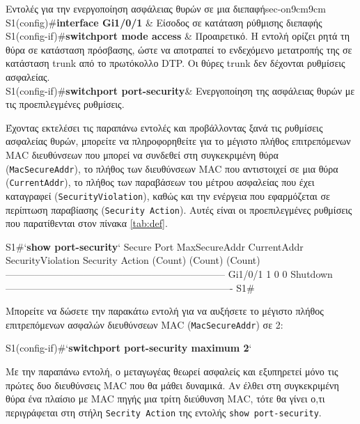 \documentclass{EdipyLabs} %
\begin{document}
\begin{CommandTable*}{Εντολές για την ενεργοποίηση ασφάλειας θυρών σε μια διεπαφή}{sec-on}{9cm}{9cm}
	S1(config)\#\textbf{interface Gi1/0/1}			& Είσοδος σε κατάταση ρύθμισης διεπαφής\\
	S1(config-if)\#\textbf{switchport mode access}  & Προαιρετικό. Η εντολή ορίζει ρητά τη θύρα σε κατάσταση πρόσβασης, ώστε να αποτραπεί το ενδεχόμενο μετατροπής της σε κατάσταση trunk από το πρωτόκολλο DTP. Οι θύρες trunk δεν δέχονται ρυθμίσεις ασφαλείας.\\
	S1(config-if)\#\textbf{switchport port-security}& Ενεργοποίηση της ασφάλειας θυρών με τις προεπιλεγμένες ρυθμίσεις.
\end{CommandTable*}
	
Έχοντας εκτελέσει τις παραπάνω εντολές και προβάλλοντας ξανά τις ρυθμίσεις ασφαλείας θυρών, μπορείτε να πληροφορηθείτε για το μέγιστο πλήθος επιτρεπόμενων MAC διευθύνσεων που μπορεί να συνδεθεί στη συγκεκριμένη θύρα (\texttt{MacSecureAddr}), το πλήθος των διευθύνσεων MAC που αντιστοιχεί σε μια θύρα (\texttt{CurrentAddr}), το πλήθος των παραβάσεων του μέτρου ασφαλείας που έχει καταγραφεί (\texttt{SecurityViolation}), καθώς και την ενέργεια που εφαρμόζεται σε περίπτωση παραβίασης (\texttt{Security Action}). Αυτές είναι οι προεπιλεγμένες ρυθμίσεις που παρατίθενται στον πίνακα \ref{tab:def}.

\begin{CommandBox}
S1#`\textbf{show port-security}`
Secure Port MaxSecureAddr CurrentAddr SecurityViolation Security Action
               (Count)       (Count)        (Count)
--------------------------------------------------------------------
	Gi1/0/1        1          0                 0         Shutdown
----------------------------------------------------------------------
S1#
\end{CommandBox}

Μπορείτε να δώσετε την παρακάτω εντολή για να αυξήσετε το μέγιστο πλήθος επιτρεπόμενων ασφαλών διευθύνσεων MAC (\texttt{MacSecureAddr}) σε 2:

\begin{CommandBox}
S1(config-if)#`\textbf{switchport port-security maximum 2}`
\end{CommandBox}

Με την παραπάνω εντολή, ο μεταγωγέας θεωρεί ασφαλείς και εξυπηρετεί μόνο τις πρώτες δυο διευθύνσεις MAC που θα μάθει δυναμικά. Αν έλθει στη συγκεκριμένη θύρα ένα πλαίσιο με MAC πηγής μια τρίτη διεύθυνση MAC, τότε θα γίνει ο,τι περιγράφεται στη στήλη \texttt{Secrity Action} της εντολής \texttt{show port-security}. 
\end{document}
